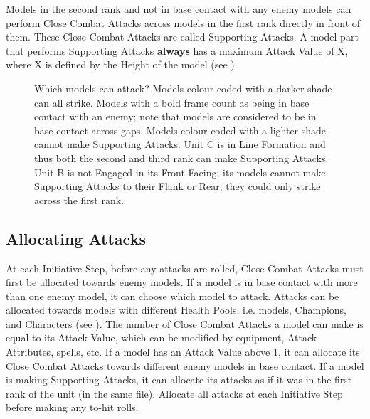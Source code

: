Models in the second rank and not in base contact with any enemy models can perform Close Combat Attacks across models in the first rank directly in front of them. These Close Combat Attacks are called Supporting Attacks. A model part that performs Supporting Attacks \textbf{always} has a maximum Attack Value of X, where X is defined by the Height of the model (see ).

\begin{figure}[!htbp]
	\begin{minipage}{0.38\textwidth}
		\renewcommand{\figbiglettersize}{22}
		\def\svgwidth{\textwidth}
		
	\end{minipage}\hfill\begin{minipage}{0.59\textwidth}
		\caption{Which models can attack?\captionpar
		Models colour-coded with a darker shade can all strike. Models with a bold frame count as being in base contact with an enemy; note that models are considered to be in base contact across gaps. Models colour-coded with a lighter shade cannot make Supporting Attacks.\captionpar
		Unit C is in Line Formation and thus both the second and third rank can make Supporting Attacks. Unit B is not Engaged in its Front Facing; its models cannot make Supporting Attacks to their Flank or Rear; they could only strike across the first rank.%
		}
		\label{figure/empty_gaps}
	\end{minipage}
\end{figure}

\subsection{Allocating Attacks}
\label{allocation_attacks}\label{allocating_attacks}

At each Initiative Step, before any attacks are rolled, Close Combat Attacks must first be allocated towards enemy models. If a model is in base contact with more than one enemy model, it can choose which model to attack. Attacks can be allocated towards models with different Health Pools, i.e. \rnf{} models, Champions, and Characters (see ). The number of Close Combat Attacks a model can make is equal to its Attack Value, which can be modified by equipment, Attack Attributes, spells, etc. If a model has an Attack Value above 1, it can allocate its Close Combat Attacks towards different enemy models in base contact. If a model is making Supporting Attacks, it can allocate its attacks as if it was in the first rank of the unit (in the same file). Allocate all attacks at each Initiative Step before making any to-hit rolls.

